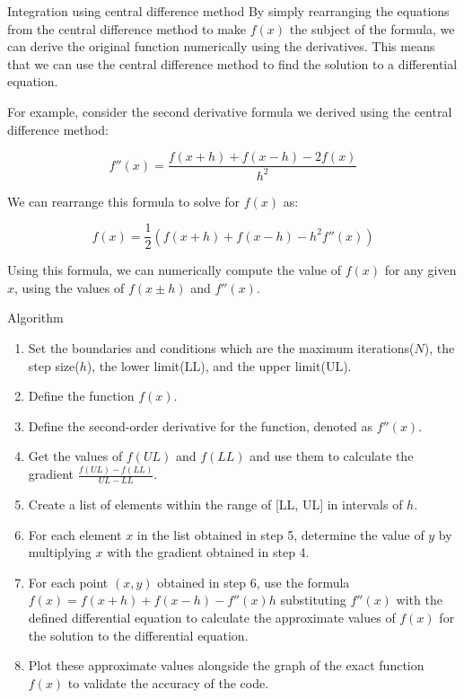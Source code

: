 \documentclass{beamer}
\begin{document}
\begin{frame}{Integration using central difference method}
By simply rearranging the equations from the central difference method to make $f(x)$ the subject of the formula, we can derive the original function numerically using the derivatives. This means that we can use the central difference method to find the solution to a differential equation.

For example, consider the second derivative formula we derived using the central difference method:

\begin{equation*}
f''(x) = \frac{f(x+h) + f(x-h) - 2f(x)}{h^2}
\end{equation*}

We can rearrange this formula to solve for $f(x)$ as:

\begin{equation*}
f(x) = \frac{1}{2}(f(x+h) + f(x-h) - h^2f''(x))
\end{equation*}

Using this formula, we can numerically compute the value of $f(x)$ for any given $x$, using the values of $f(x\pm h)$ and $f''(x)$.

\end{frame}
\begin{frame}{Algorithm}
\begin{enumerate}
\item Set the boundaries and conditions which are the maximum iterations($N$),
the step size($h$), the lower limit(LL), and the upper limit(UL).
\item Define the function $f(x)$.
\item Define the second-order derivative for the function, denoted as $f''(x)$.
\item Get the values of $f(UL)$ and $f(LL)$ and use them to calculate the gradient
$\frac{f(UL)-f(LL)}{UL-LL}$.
\item Create a list of elements within the range of [LL, UL] in intervals of $h$.
\item For each element $x$ in the list obtained in step 5, determine the value of $y$
by multiplying $x$ with the gradient obtained in step 4.
\item For each point $(x, y)$ obtained in step 6, use the formula $f(x) = f(x + h) + f(x - h) - f''(x)h$
substituting $f''(x)$ with the defined differential equation to calculate the approximate values of $f(x)$ for the solution to the differential equation.
\item Plot these approximate values alongside the graph of the exact function $f(x)$ to validate the accuracy of the code.
\end{enumerate}
\end{frame}
\end{document}
